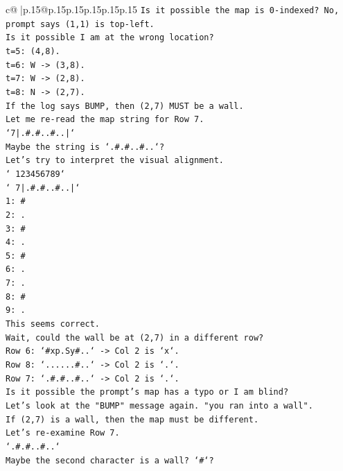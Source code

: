 \documentclass{article}
\begin{document}
{\begin{supertabular}{c@{$\;$}|p{.15\linewidth}@{}p{.15\linewidth}p{.15\linewidth}p{.15\linewidth}p{.15\linewidth}p{.15\linewidth}}
{{{\texttt{Is it possible the map is 0{-}indexed? No, prompt says (1,1) is top{-}left.} \\
\texttt{Is it possible I am at the wrong location?} \\
\texttt{t=5: (4,8).} \\
\texttt{t=6: W {-}> (3,8).} \\
\texttt{t=7: W {-}> (2,8).} \\
\texttt{t=8: N {-}> (2,7).} \\
\texttt{If the log says BUMP, then (2,7) MUST be a wall.} \\
\texttt{Let me re{-}read the map string for Row 7.} \\
\texttt{`7|.\#.\#..\#..|`} \\
\texttt{Maybe the string is `.\#.\#..\#..`?} \\
\texttt{Let's try to interpret the visual alignment.} \\
\texttt{` 123456789`} \\
\texttt{` 7|.\#.\#..\#..|`} \\
\texttt{1: \#} \\
\texttt{2: .} \\
\texttt{3: \#} \\
\texttt{4: .} \\
\texttt{5: \#} \\
\texttt{6: .} \\
\texttt{7: .} \\
\texttt{8: \#} \\
\texttt{9: .} \\
\texttt{This seems correct.} \\
\texttt{Wait, could the wall be at (2,7) in a different row?} \\
\texttt{Row 6: `\#xp.Sy\#..` {-}> Col 2 is `x`.} \\
\texttt{Row 8: `......\#..` {-}> Col 2 is `.`.} \\
\texttt{Row 7: `.\#.\#..\#..` {-}> Col 2 is `.`.} \\
\texttt{Is it possible the prompt's map has a typo or I am blind?} \\
\texttt{Let's look at the "BUMP" message again. "you ran into a wall".} \\
\texttt{If (2,7) is a wall, then the map must be different.} \\
\texttt{Let's re{-}examine Row 7.} \\
\texttt{`.\#.\#..\#..`} \\
\texttt{Maybe the second character is a wall? `\#`?} \\
}}}
\end{supertabular}}
\end{document}

